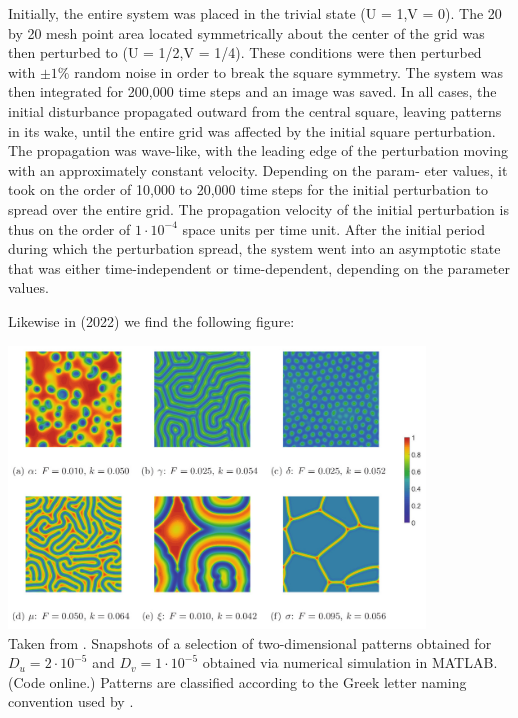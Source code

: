 Initially, the entire system was placed in the trivial state (U = 1,V = 0). The 20 by
20 mesh point area located symmetrically about the center of the grid was then
perturbed to (U = 1/2,V = 1/4). These conditions were then perturbed with $\pm 1\%$
random noise in order to break the square symmetry. The system was then integrated
for 200,000 time steps and an image was
saved. In all cases, the initial disturbance
propagated outward from the central
square, leaving patterns in its wake, until
the entire grid was affected by the initial
square perturbation. The propagation was
wave-like, with the leading edge of the
perturbation moving with an approximately
constant velocity. Depending on the param-
eter values, it took on the order of 10,000 to
20,000 time steps for the initial perturbation
to spread over the entire grid. The propagation velocity of the initial perturbation is
thus on the order of $1\cdot 10^{-4}$ space units per time unit. After the initial period during
which the perturbation spread, the system
went into an asymptotic state that was either
time-independent or time-dependent, depending on the parameter values.

Likewise in \textcite{gane22} (2022) we find the following figure:
\begin{center}
\includegraphics[height=7.5cm]{python_codes/fieldstone_171/images/gane22}\\
{\captionfont Taken from \cite{gane22}. 
Snapshots of a selection of two-dimensional patterns obtained for
$D_u=2\cdot 10^{-5}$ and $D_v=1\cdot 10^{-5}$ obtained via numerical 
simulation in MATLAB. (Code online.) Patterns
are classified according to the Greek letter naming convention used by \textcite{pear93}.
} 
\end{center}

